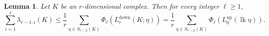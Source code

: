 \documentclass[12pt]{amsart}
\theoremstyle{plain}
\newtheorem{lem}[thm]{Lemma}
\theoremstyle{definition}
\numberwithin{equation}{section}
\numberwithin{figure}{section}
\newcommand{\Ldown}{L^{\operatorname{down}}}
\newcommand{\Lup}{L^{\operatorname{up}}}
\newcommand{\lk}{\operatorname{lk}}
\newcommand{\p}{\partial}
\begin{document}
%

\begin{lem}\label{com-graph}
Let $K$ be an $r$-dimensional complex.
Then for every integer $\ell \geq 1$,
\[
\sum_{i = 1}^\ell \lambda_{r-1,i}(K)
\leq
\frac{1}{r}
\sum_{\eta \in S_{r - 2}(K)}
\Phi_\ell(\Ldown_r(K;\eta))
=
\frac{1}{r}\sum_{\eta \in S_{r - 2}(K)}\Phi_\ell(\Lup_0(\lk \eta)).
\]
\end{lem}
\end{document}
